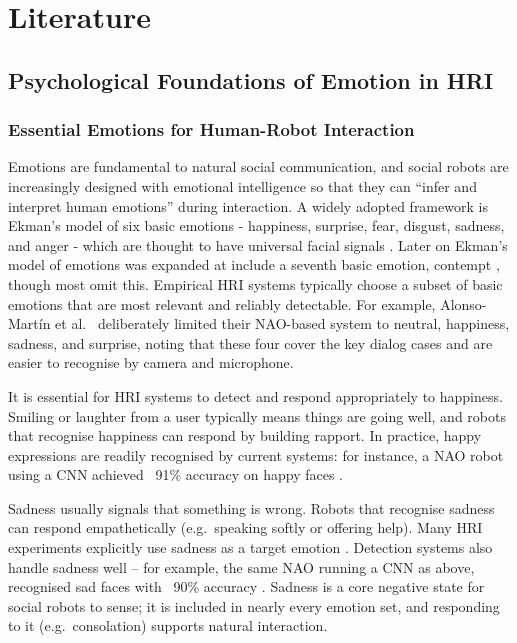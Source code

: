 \chapter{Literature}

\section{Psychological Foundations of Emotion in HRI}

\subsection{Essential Emotions for Human-Robot Interaction}

Emotions are fundamental to natural social communication, and social robots are increasingly designed with emotional intelligence so that they can ``infer and interpret human emotions'' during interaction. A widely adopted framework is Ekman's model of six basic emotions - happiness, surprise, fear, disgust, sadness, and anger - which are thought to have universal facial signals \cite{Reyes2019-go}. Later on Ekman's model of emotions was expanded at include a seventh basic emotion, contempt \cite{Matsumoto1992-jf}, though most omit this. Empirical HRI systems typically choose a subset of basic emotions that are most relevant and reliably detectable. For example, Alonso-Martín et al.\ \cite{Alonso-Martin2013-cv} deliberately limited their NAO-based system to neutral, happiness, sadness, and surprise, noting that these four cover the key dialog cases and are easier to recognise by camera and microphone.

It is essential for HRI systems to detect and respond appropriately to happiness. Smiling or laughter from a user typically means things are going well, and robots that recognise happiness can respond by building rapport. In practice, happy expressions are readily recognised by current systems: for instance, a NAO robot using a CNN achieved ~91\% accuracy on happy faces \cite{Filippini2021-ni}.

Sadness usually signals that something is wrong. Robots that recognise sadness can respond empathetically (e.g.\ speaking softly or offering help). Many HRI experiments explicitly use sadness as a target emotion \cite{Stock-Homburg2022-wd}. Detection systems also handle sadness well -- for example, the same NAO running a CNN as above, recognised sad faces with ~90\% accuracy \cite{Filippini2021-ni}. Sadness is a core negative state for social robots to sense; it is included in nearly every emotion set, and responding to it (e.g.\ consolation) supports natural interaction.

